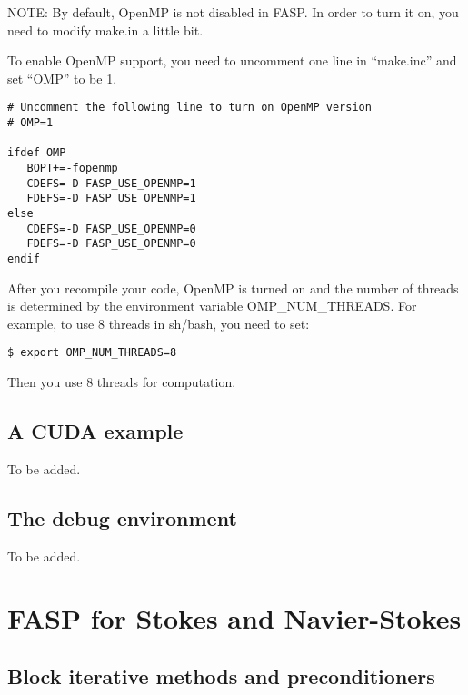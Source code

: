 \documentclass[11pt]{memoir}
\begin{document}
\begin{snugshade}\noindent
NOTE: By default, OpenMP is not disabled in FASP. In order to turn it on, you need to modify make.in a little bit.
\end{snugshade}

To enable OpenMP support, you need to uncomment one line in ``make.inc'' and set ``OMP'' to be 1.
\begin{lstlisting}[numbers=none]
# Uncomment the following line to turn on OpenMP version
# OMP=1

ifdef OMP
   BOPT+=-fopenmp
   CDEFS=-D FASP_USE_OPENMP=1
   FDEFS=-D FASP_USE_OPENMP=1
else
   CDEFS=-D FASP_USE_OPENMP=0
   FDEFS=-D FASP_USE_OPENMP=0
endif
\end{lstlisting}

After you recompile your code, OpenMP is turned on and the number of threads is determined by the environment variable OMP\_NUM\_THREADS. For example, to use 8 threads in {\color{red} sh/bash}, you need to set:
\begin{lstlisting}[numbers=none]
$ export OMP_NUM_THREADS=8
\end{lstlisting}
Then you use 8 threads for computation.

\section{A CUDA example}\label{sec:cuda}

To be added.

\section{The debug environment}\label{sec:debug}

To be added.

\chapter{FASP for Stokes and Navier-Stokes}\label{ch:ns}

\section{Block iterative methods and preconditioners}\label{sec:block}
\end{document}
